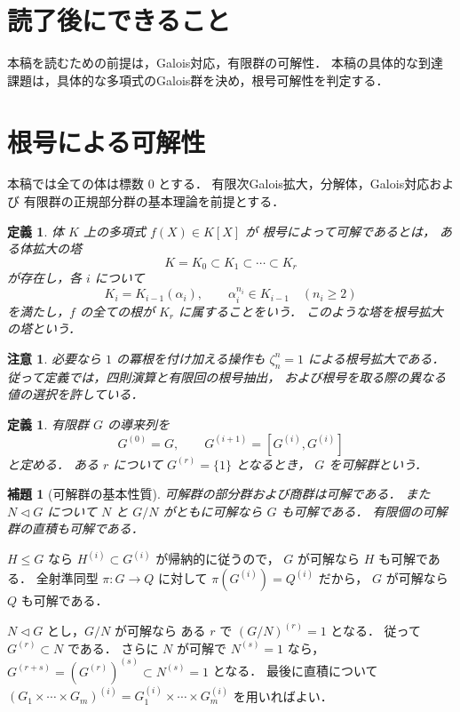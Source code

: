 \documentclass[a5paper,10pt,onecolumn]{jsarticle}
\makeatletter
\theoremstyle{mathnotetheorem}
\newtheorem{definition}[theorem]{定義}
\newtheorem{lemma}[theorem]{補題}
\newtheorem{remark}[theorem]{注意}
\renewcommand{\proofname}{証明}
\renewenvironment{proof}[1][\proofname]{%
  \par\pushQED{\qed}\normalfont\topsep4\p@\@plus2\p@\relax
  \trivlist\item[\hskip\labelsep\bfseries #1]\ignorespaces
}{\popQED\endtrivlist\@endpefalse}
\makeatother
\begin{document}
\section*{読了後にできること}
本稿を読むための前提は，Galois対応，有限群の可解性．
本稿の具体的な到達課題は，具体的な多項式のGalois群を決め，根号可解性を判定する．

\section{根号による可解性}

本稿では全ての体は標数 $0$ とする．
有限次Galois拡大，分解体，Galois対応および
有限群の正規部分群の基本理論を前提とする．

\begin{definition}
体 $K$ 上の多項式 $f(X)\in K[X]$ が
\emph{根号によって可解}であるとは，
ある体拡大の塔
\[
 K=K_0\subset K_1\subset\cdots\subset K_r
\]
が存在し，各 $i$ について
\[
 K_i=K_{i-1}(\alpha_i),\qquad
 \alpha_i^{n_i}\in K_{i-1}
 \quad(n_i\ge2)
\]
を満たし，$f$ の全ての根が $K_r$ に属することをいう．
このような塔を\emph{根号拡大の塔}という．
\end{definition}

\begin{remark}
必要なら $1$ の冪根を付け加える操作も
$\zeta_n^n=1$ による根号拡大である．
従って定義では，四則演算と有限回の根号抽出，
および根号を取る際の異なる値の選択を許している．
\end{remark}

\begin{definition}
有限群 $G$ の導来列を
\[
 G^{(0)}=G,\qquad
 G^{(i+1)}=[G^{(i)},G^{(i)}]
\]
と定める．
ある $r$ について $G^{(r)}=\{1\}$ となるとき，
$G$ を\emph{可解群}という．
\end{definition}

\begin{lemma}[可解群の基本性質]\label{lem:solvable}
可解群の部分群および商群は可解である．
また $N\triangleleft G$ について
$N$ と $G/N$ がともに可解なら $G$ も可解である．
有限個の可解群の直積も可解である．
\end{lemma}
\begin{proof}
$H\le G$ なら
$H^{(i)}\subset G^{(i)}$ が帰納的に従うので，
$G$ が可解なら $H$ も可解である．
全射準同型 $\pi:G\to Q$ に対して
$\pi(G^{(i)})=Q^{(i)}$ だから，
$G$ が可解なら $Q$ も可解である．

$N\triangleleft G$ とし，$G/N$ が可解なら
ある $r$ で $(G/N)^{(r)}=1$ となる．
従って $G^{(r)}\subset N$ である．
さらに $N$ が可解で $N^{(s)}=1$ なら，
$G^{(r+s)}=(G^{(r)})^{(s)}
 \subset N^{(s)}=1$ となる．
最後に直積について
$(G_1\times\cdots\times G_m)^{(i)}
 =G_1^{(i)}\times\cdots\times G_m^{(i)}$
を用いればよい．
\end{proof}
\end{document}
